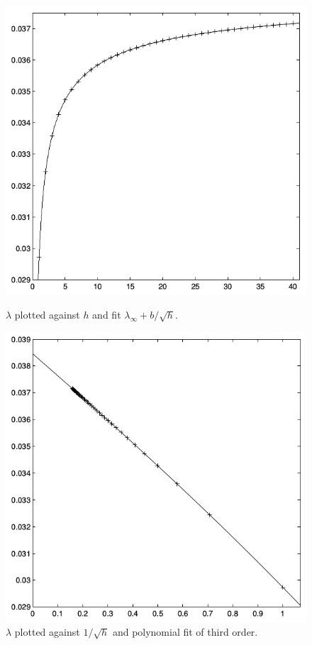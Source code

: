 	\begin{figure}[h]	
		\centering
		\begin{minipage}{0.45\textwidth}
			\includegraphics[scale=0.31]{images/backflow_approx_1}
			\caption{$\lambda$ plotted against $h$ and fit $\lambda_\infty+b/\sqrt h$.}
			\label{fig:backflow_approx_1}
		\end{minipage}
		\hfil
		\begin{minipage}{0.45\textwidth}
			\includegraphics[scale=0.31]{images/backflow_approx_2}
			\caption{$\lambda$ plotted against $1/\sqrt h$ and polynomial fit of third order.}
			\label{fig:backflow_approx_2}
		\end{minipage}
	\end{figure}
	

